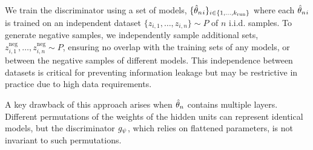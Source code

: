 We train the discriminator using a set of models, $\{{\hat{\theta}_n}{_ i}\}_{i\in\{1,\ldots,k_{\text{run}}\}}$ where each ${\hat{\theta}_n}{_ i}$ is trained on an independent dataset $\{z_{i,1},\ldots, z_{i,n}\} \sim P$ of $n$ i.i.d. samples.
To generate negative samples, we independently sample additional sets, $z^{\textrm{neg}}_{i,1},\ldots,z^{\textrm{neg}}_{i,n} \sim P$, ensuring no overlap with the training sets of any models, or between the negative samples of different models.
This independence between datasets is critical for preventing information leakage but may be restrictive in practice due to high data requirements.


A key drawback of this approach arises when ${\hat{\theta}_n}$ contains multiple layers.
Different permutations of the weights of the hidden units can represent identical models, but the discriminator $g_\psi$, which relies on flattened parameters, is not invariant to such permutations.
